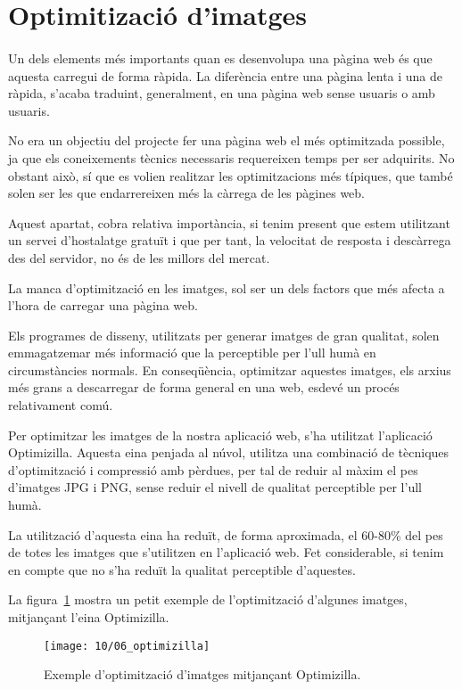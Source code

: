 \section{Optimitizació d'imatges}

    \paragraph{}
    Un dels elements més importants quan es desenvolupa una pàgina web és que aques\-ta carregui de forma ràpida. La diferència entre una pàgina lenta i una de rà\-pi\-da, s'acaba traduint, generalment, en una pàgina web sense usuaris o amb usuaris.

    No era un objectiu del projecte fer una pàgina web el més optimitzada possible, ja que els coneixements tècnics necessaris requereixen temps per ser adquirits. No obstant això, sí que es volien realitzar les optimitzacions més típiques, que també solen ser les que endarrereixen més la càrrega de les pàgines web.

    Aquest apartat, cobra relativa importància, si tenim present que estem utilitzant un servei d'hostalatge gratuït i que per tant, la velocitat de resposta i descàrrega des del servidor, no és de les millors del mercat.

    La manca d'optimització en les imatges, sol ser un dels factors que més afecta a l'hora de carregar una pàgina web.

    Els programes de disseny, utilitzats per generar imatges de gran qualitat, solen emmagatzemar més informació que la perceptible per l'ull humà en circumstàncies normals. En conseqüència, optimitzar aquestes imatges, els arxius més grans a descarregar de forma general en una web, esdevé un procés relativament comú.

    Per optimitzar les imatges de la nostra aplicació web, s'ha utilitzat l'aplicació Optimizilla. Aquesta eina penjada al núvol, utilitza una combinació de tècniques d'optimització i compressió amb pèrdues, per tal de reduir al màxim el pes d'imatges JPG i PNG, sense reduir el nivell de qualitat perceptible per l'ull humà.

    La utilització d'aquesta eina ha reduït, de forma aproximada, el 60-80\% del pes de totes les imatges que s'utilitzen en l'aplicació web. Fet considerable, si tenim en compte que no s'ha reduït la qualitat perceptible d'aquestes.

    La figura~\ref{img:optimizilla} mostra un petit exemple de l'optimització d'algunes imatges, mitjançant l'eina Optimizilla.

    \begin{figure}[h]
        \texttt{[image: 10/06\_optimizilla]}
        \centering
        \caption{Exemple d'optimització d'imatges mitjançant Optimizilla.}\label{img:optimizilla}
    \end{figure}
